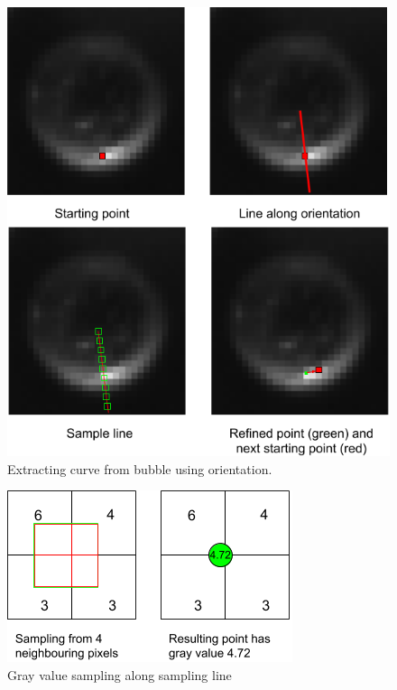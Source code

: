 				 \begin{figure}
				 	\centering
				 	\includegraphics[scale=.5]{images/curve_from_orientation.png}
				 	\caption{Extracting curve from bubble using orientation.}
				 	\label{fig:curve_from_orientation}
				 \end{figure}
				 
				 \begin{figure}
				 	\centering
				 	\includegraphics[scale=.5]{images/subpixel_sampling.png}
				 	\caption{Gray value sampling along sampling line}
				 	\label{fig:subpixel_sampling}
				 \end{figure}
				 
